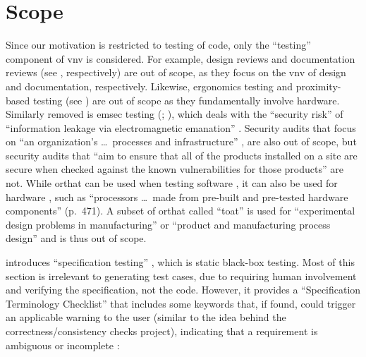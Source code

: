 \section{Scope}
\label{scope}

Since our motivation is restricted to testing of code, only the ``testing''
component of \acf{vnv} is considered.
For example, design reviews and documentation reviews
\ifnotpaper \citep[see][pp.~132, 144, respectively]{IEEE2017}
\else (see \cite[pp.~132, 144]{IEEE2017}, respectively) \fi
are out of scope, as they focus on the \acs{vnv} of design and documentation,
respectively. Likewise, ergonomics testing
and proximity-based testing (see \citealpISTQB{}) are out of scope as they
fundamentally involve hardware.
\ifnotpaper
      Similarly removed is \acf{emsec} testing
      (\citealp{ISO2021}; \citealp[p.~95]{ZhouEtAl2012}), which deals with the
      ``security risk'' of ``information leakage via electromagnetic emanation''
      \citep[p.~95]{ZhouEtAl2012}.
\fi Security audits that focus on ``an organization's
\dots\ processes and infrastructure'' \citepISTQB{}, are also out of scope,
but security audits that ``aim to ensure that all of the products installed on
a site are secure when checked against the known vulnerabilities for those
products'' \citep[p.~28]{Gerrard2000b} are not.
\ifnotpaper While \acf{orthat}
      can be used when testing software \citep{Mandl1985}, it can also be used for
      hardware \citep[pp.~471-472]{Valcheva2013}, such as ``processors \dots\ made
      from pre-built and pre-tested hardware components'' (p.~471). A subset of
      \acs{orthat} called ``\acf{toat}'' is used for ``experimental design problems in
      manufacturing'' \citep[p.~1573]{YuEtAl2011} or ``product and manufacturing
      process design'' \cite[p.~44]{Tsui2007} and is thus out of scope.

      \citeauthor{Patton2006} introduces ``specification testing''
      \citeyearpar[pp.~56-62]{Patton2006}, which is static black-box testing.
      Most of this section is irrelevant to generating test cases, due to
      requiring human involvement and verifying the specification, not the code.
      However, it provides a ``Specification Terminology Checklist''
      \citep[p.~61]{Patton2006} that includes some keywords that, if found, could
      trigger an applicable warning to the user (similar to the idea behind the
      correctness/consistency checks project), indicating that a requirement is
      ambiguous or incomplete \citep[see][p.~1-8]{SWEBOK2024}:

